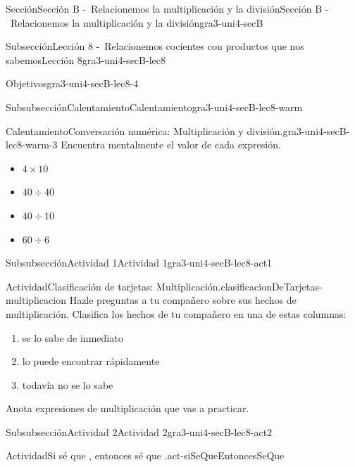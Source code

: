 \documentclass[twoside,10pt,]{article}
\begin{document}
\begin{sectionptx}{Sección}{Sección B -~Relacionemos la multiplicación y la división}{}{Sección B -~Relacionemos la multiplicación y la división}{}{}{gra3-uni4-secB}
\begin{subsectionptx}{Subsección}{Lección 8 -~Relacionemos cocientes con productos que nos sabemos}{}{Lección 8}{}{}{gra3-uni4-secB-lec8}
\begin{objectives}{Objetivos}{gra3-uni4-secB-lec8-4}
\end{objectives}
%
%
\typeout{************************************************}
\typeout{************************************************}
%
\begin{subsubsectionptx}{Subsubsección}{Calentamiento}{}{Calentamiento}{}{}{gra3-uni4-secB-lec8-warm}
\begin{exploration}{Calentamiento}{Conversación numérica: Multiplicación y división.}{gra3-uni4-secB-lec8-warm-3}%
Encuentra mentalmente el valor de cada expresión.%
%
\begin{itemize}[label=\textbullet]
\item{}\(\displaystyle 4\times 10\)%
\item{}\(\displaystyle 40\div 40\)%
\item{}\(\displaystyle 40\div 10\)%
\item{}\(\displaystyle 60\div 6\)%
\end{itemize}
\end{exploration}%
\end{subsubsectionptx}
%
%
\typeout{************************************************}
\typeout{************************************************}
%
\begin{subsubsectionptx}{Subsubsección}{Actividad 1}{}{Actividad 1}{}{}{gra3-uni4-secB-lec8-act1}
\begin{activity}{Actividad}{Clasificación de tarjetas: Multiplicación.}{clasificacionDeTarjetas-multiplicacion}%
Hazle preguntas a tu compañero sobre sus hechos de multiplicación. Clasifica los hechos de tu compañero en una de estas columnas:%
%
\begin{enumerate}
\item{}se lo sabe de inmediato%
\item{}lo puede encontrar rápidamente%
\item{}todavía no se lo sabe%
\end{enumerate}
Anota expresiones de multiplicación que vas a practicar.%
\end{activity}%
\end{subsubsectionptx}
%
%
\typeout{************************************************}
\typeout{************************************************}
%
\begin{subsubsectionptx}{Subsubsección}{Actividad 2}{}{Actividad 2}{}{}{gra3-uni4-secB-lec8-act2}
\begin{activity}{Actividad}{Si sé que \textellipsis{}, entonces sé que \textellipsis{}.}{act-siSeQueEntoncesSeQue}%

\end{activity}
\end{subsubsectionptx}
\end{subsectionptx}
\end{sectionptx}
\end{document}
